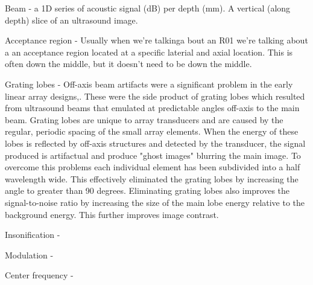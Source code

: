 Beam - a 1D series of acoustic signal (dB) per depth (mm). A vertical (along depth) slice of an ultrasound image.

Acceptance region - Usually when we're talkinga bout an R01 we're talking about a an acceptance region located at a specific laterial and axial location.  This is often down the middle, but it doesn't need to be down the middle.


Grating lobes - Off-axis beam artifacts were a significant problem in the early linear array designs,. These were the side product of grating lobes which resulted from ultrasound beams that emulated at predictable angles off-axis to the main beam. Grating lobes are unique to array transducers and are caused by the regular, periodic spacing of the small array elements. When the energy of these lobes is reflected by off-axis structures and detected by the transducer, the signal produced is artifactual and produce "ghost images" blurring the main image. To overcome this problems each individual element has been subdivided into a half wavelength wide. This effectively eliminated the grating lobes by increasing the angle to greater than 90 degrees. Eliminating grating lobes also improves the signal-to-noise ratio by increasing the size of the main lobe energy relative to the background energy. This further improves image contrast.

Insonification -

Modulation -

Center frequency - 
